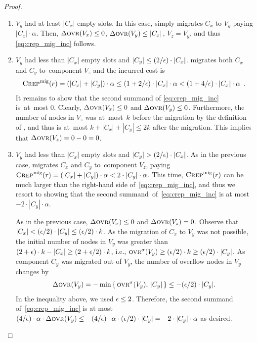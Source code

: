 \begin{proof}
\begin{enumerate}
\item 
$V_y$ had at least $|C_x|$ empty slots. In this case, \CREP simply migrates
$C_x$ to $V_y$ paying $|C_x| \cdot \alpha$. Then, $\Delta \textsc{ovr}(V_x) \leq 0$,
$\Delta \textsc{ovr}(V_y) \leq |C_x|$, $V_z = V_y$, and thus \eqref{eq:crep_mig_inc}
follows.

\item 
$V_y$ had less than $|C_x|$ empty slots and $|C_y| \leq (2/\epsilon) \cdot |C_x|$.
\CREP migrates both $C_x$ and $C_y$ to~component $V_z$ and the incurred cost is 
\[
\textsc{Crep}^\textnormal{mig}(r) = (|C_x| + |C_y|) \cdot \alpha \leq (1+2/\epsilon) \cdot |C_x| \cdot \alpha
< (1 + 4/\epsilon) \cdot |C_x| \cdot \alpha\enspace.
\]
It remains to show that the second summand of \eqref{eq:crep_mig_inc} is~at~most $0$. 
Clearly, $\Delta \textsc{ovr}(V_x) \leq 0$ and $\Delta \textsc{ovr}(V_y) \leq 0$. 
Furthermore, the number of 
nodes in $V_z$ was at~most~$k$ before the migration by the definition of \CREP,
and thus is at~most $k + |C_x| + |C_y| \leq 2k$ after the migration.
This implies that $\Delta \textsc{ovr}(V_z) = 0 - 0 = 0$.

\item 
$V_y$ had less than $|C_x|$ empty slots and $|C_y| > (2/\epsilon) \cdot |C_x|$.
As in the previous case, \CREP migrates $C_x$ and $C_y$ to~component $V_z$, 
paying $\textsc{Crep}^\textnormal{mig}(r) = (|C_x| + |C_y|) \cdot \alpha < 2 \cdot |C_y| \cdot \alpha$.
This time, $\textsc{Crep}^\textnormal{mig}(r)$ can be much larger than the right-hand side 
of~\eqref{eq:crep_mig_inc}, and thus we resort to showing that 
the second summand~of~\eqref{eq:crep_mig_inc} is at most $ - 2 \cdot |C_y| \cdot \alpha$.

As in the previous case, $\Delta \textsc{ovr}(V_x) \leq 0$ and $\Delta \textsc{ovr}(V_z) = 0$. 
Observe that $|C_x| < (\epsilon / 2) \cdot |C_y| \leq (\epsilon / 2) \cdot k$.
As the migration of $C_x$ to $V_y$ was not possible, the initial number
of nodes in $V_y$ was greater than $(2 + \epsilon) \cdot k - |C_x| \geq (2+\epsilon/2) \cdot k$,
i.e., $\textsc{ovr}^\sigma(V_y) \geq (\epsilon/2) \cdot k \geq (\epsilon/2) \cdot |C_y|$. 
As component $C_y$ was migrated out of $V_y$, the number of overflow nodes in $V_y$ changes by
\[
	\Delta \textsc{ovr}(V_y) 
		= - \min \left\{ \,\textsc{ovr}^\sigma(V_y), \,|C_y| \,\right\}
		\leq - (\epsilon/2) \cdot |C_y|.
\]
In the inequality above, we used $\epsilon \leq 2$.
Therefore, the second summand of~\eqref{eq:crep_mig_inc} is at most 
$(4/\epsilon) \cdot \alpha \cdot \Delta\textsc{ovr}(V_y) \leq - 
(4/\epsilon) \cdot \alpha \cdot (\epsilon/2) \cdot |C_y|
= - 2 \cdot |C_y| \cdot \alpha$ as desired.
\end{enumerate}
\end{proof}

